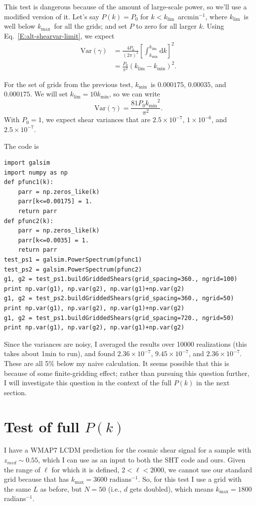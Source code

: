 \documentclass[preprint]{aastex}
\newcommand{\klim}{\ensuremath{k_\mathrm{lim}}}
\newcommand{\kmax}{\ensuremath{k_\mathrm{max}}}
\newcommand{\kmin}{\ensuremath{k_\mathrm{min}}}
\newcommand{\rmd}{\ensuremath{\mathrm{d}}}
\newcommand{\beq}{\begin{equation}}
\newcommand{\eeq}{\end{equation}}
\begin{document}
This test is dangerous because of the amount of large-scale power, so
we'll use a modified version of it.  Let's say $P(k)=P_0$ for
$k<$\klim\ arcmin$^{-1}$, where \klim\ is well below \kmax\ for all the
grids; and set $P$ to zero for all larger $k$. Using Eq.~\ref{E:alt-shearvar-limit}, we expect
\begin{align}
\mathrm{Var}(\gamma) &= \frac{4P_0}{(2\pi)^2}
\left[\int_{\kmin}^{\klim} \rmd k\right]^2 \\
 &= \frac{P_0}{\pi^2} \left(\klim-\kmin\right)^2.
\end{align}

For the set of grids from the previous test, \kmin\ is
$0.000175$, $0.00035$, and $0.000175$.  We will set $\klim=10\kmin$,
so we can write
\beq
\mathrm{Var}(\gamma) = \frac{81 P_0 \kmin^2}{\pi^2}.
\eeq
With $P_0=1$, we expect
shear variances that are $2.5\times 10^{-7}$, $1\times 10^{-6}$,
and $2.5\times 10^{-7}$.

The code is
\begin{verbatim}
import galsim
import numpy as np
def pfunc1(k):
    parr = np.zeros_like(k)
    parr[k<=0.00175] = 1.
    return parr
def pfunc2(k):
    parr = np.zeros_like(k)
    parr[k<=0.0035] = 1.
    return parr
test_ps1 = galsim.PowerSpectrum(pfunc1)
test_ps2 = galsim.PowerSpectrum(pfunc2)
g1, g2 = test_ps1.buildGriddedShears(grid_spacing=360., ngrid=100)
print np.var(g1), np.var(g2), np.var(g1)+np.var(g2)
g1, g2 = test_ps2.buildGriddedShears(grid_spacing=360., ngrid=50)
print np.var(g1), np.var(g2), np.var(g1)+np.var(g2)
g1, g2 = test_ps1.buildGriddedShears(grid_spacing=720., ngrid=50)
print np.var(g1), np.var(g2), np.var(g1)+np.var(g2)
\end{verbatim}

Since the variances are noisy, I averaged the results over 10000
realizations (this takes about 1min to run), and found $2.36\times
10^{-7}$, $9.45\times 10^{-7}$, and $2.36\times 10^{-7}$.  These are all
5\% below my naive calculation.  It seems possible that this is
because of some finite-gridding effect; rather than pursuing this
question further, I will investigate this question in the context of
the full $P(k)$ in the next section.

\section{Test of full $P(k)$}\label{S:testpk}

I have a WMAP7 LCDM prediction for the cosmic shear signal for a
sample with $z_{med}\sim 0.55$, which I can use as an input to both
the SHT code and ours.  Given the range of $\ell$ for which it is
defined, $2<\ell<2000$, we cannot use our standard grid because that
has $\kmax=3600$ radians$^{-1}$.  So, for this test I use a grid with
the same $L$ as before, but $N=50$ (i.e., $d$ gets doubled), which
means $\kmax=1800$ radians$^{-1}$.
\end{document}
